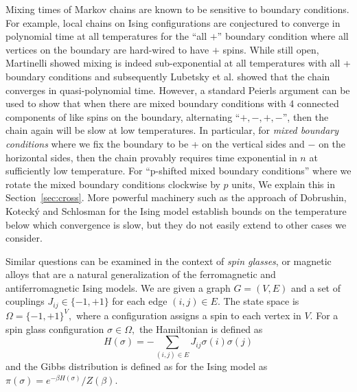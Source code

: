 \documentclass[letterpaper,english,numberwithinsect]{amsart}
\begin{document}
Mixing times of Markov chains are known to be sensitive to boundary conditions.
For example, local  chains on Ising configurations are conjectured to converge in polynomial time at all temperatures for the ``all $+$'' boundary condition where all vertices on the boundary are hard-wired to have $+$ spins.  
While still open,  
Martinelli \cite{martinelli94} showed mixing is indeed sub-exponential at all temperatures with all + boundary conditions and subsequently Lubetsky et al. \cite{lmst} showed that the chain converges in quasi-polynomial time.  
However, a standard Peierls argument can be used to show that when there are mixed boundary conditions with 4 connected components of like spins on the boundary, alternating ``$+, -, +, -$'', then the chain again will be slow at low temperatures.  In particular, for {\it mixed boundary conditions} where we fix the boundary to be + on the vertical sides and $-$ on the horizontal sides, then the chain provably requires time exponential in $n$ at sufficiently low temperature.  
For ``p-shifted mixed boundary conditions'' where we rotate the mixed  boundary conditions clockwise by $p$ units,
We explain this in Section~\ref{sec:cross}.  More powerful machinery such as the approach of Dobrushin, Koteck\'y and Schlosman 
\cite{dks} for the Ising model establish bounds on the temperature below which convergence is slow, but they do not easily extend to other cases we consider.

Similar questions can be examined in the context of {\it spin glasses},  or  magnetic alloys that are a natural generalization of the ferromagnetic and antiferromagnetic Ising models.  We are given a graph $G=(V,E)$ and a set of couplings $J_{ij} 
\in \{-1, +1\}$ for each edge $(i,j) \in E$.  The state space is $\Omega = \{-1,+1\}^V,$ where a configuration assigns a spin to each vertex in $V$.  For a spin glass configuration $\sigma \in \Omega,$ the Hamiltonian is defined as
$$H(\sigma) = - \sum_{(i,j)\in E} J_{ij} \sigma(i)\sigma(j)$$ 
and the Gibbs distribution is defined as for the Ising model as $\pi(\sigma) = e^{-\beta H(\sigma)}/Z(\beta)$.
\end{document}
